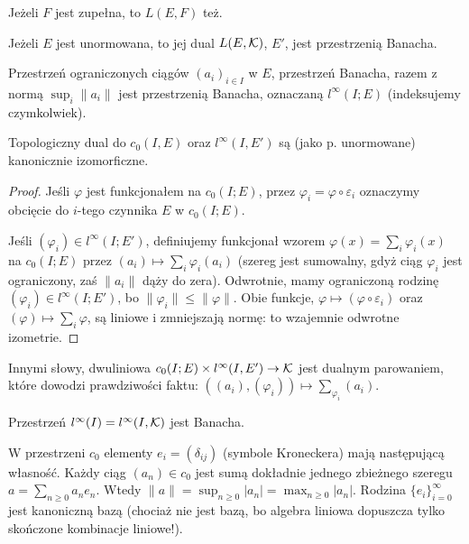 \begin{fakt}
	Jeżeli $F$ jest zupełna, to $L(E, F)$ też.
\end{fakt}

\begin{wniosek}
	Jeżeli $E$ jest unormowana, to jej dual $L(E, \mathcal K)$, $E'$, jest przestrzenią Banacha.
\end{wniosek}

Przestrzeń ograniczonych ciągów $(a_i)_{i \in I}$ w $E$, przestrzeń Banacha, razem z normą $\sup_i \|a_i\|$ jest przestrzenią Banacha, oznaczaną $l^\infty(I; E)$ (indeksujemy czymkolwiek).

\begin{fakt}
	Topologiczny dual do $c_0(I, E)$ oraz $l^\infty(I, E')$ są (jako p. unormowane) kanonicznie izomorficzne.
\end{fakt}

\begin{proof}
	Jeśli $\varphi$ jest funkcjonałem na $c_0(I; E)$, przez $\varphi_i = \varphi \circ \varepsilon_i$ oznaczymy obcięcie do $i$-tego czynnika $E$ w $c_0(I; E)$.
	
	Jeśli $(\varphi_i) \in l^\infty (I; E')$, definiujemy funkcjonał wzorem $\varphi(x) = \sum_i \varphi_i(x)$ na $c_0(I; E)$ przez $(a_i) \mapsto \sum_i \varphi_i (a_i)$ (szereg jest sumowalny, gdyż ciąg $\varphi_i$ jest ograniczony, zaś $\|a_i\|$ dąży do zera).
	Odwrotnie, mamy ograniczoną rodzinę $(\varphi_i) \in l^\infty(I; E')$, bo $\|\varphi_i\| \le \|\varphi\|$.
	Obie funkcje, $\varphi \mapsto (\varphi \circ \varepsilon_i)$ oraz $(\varphi) \mapsto \sum_i \varphi$, są liniowe i zmniejszają normę: to wzajemnie odwrotne izometrie.
\end{proof}

Innymi słowy, dwuliniowa $c_0(I; E) \times l^\infty(I, E') \to \mathcal K$ jest dualnym parowaniem, które dowodzi prawdziwości faktu: $((a_i), (\varphi_i)) \mapsto \sum_ \varphi_i(a_i)$.

\begin{wniosek}
	Przestrzeń $l^\infty(I) = l^\infty(I, \mathcal K)$ jest Banacha.
\end{wniosek}

W przestrzeni $c_0$ elementy $e_i = (\delta_{ij})$ (symbole Kroneckera) mają następującą własność.
Każdy ciąg $(a_n) \in c_0$ jest sumą dokładnie jednego zbieżnego szeregu $a = \sum_{n \ge 0} a_ne_n$.
Wtedy $\|a\| = \sup_{n \ge 0} |a_n| = \max_{n \ge 0} |a_n|$.
Rodzina $\{e_i\}_{i = 0}^\infty$ jest kanoniczną bazą (chociaż nie jest bazą, bo algebra liniowa dopuszcza tylko skończone kombinacje liniowe!).

